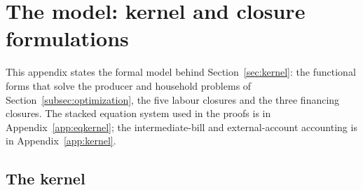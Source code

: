 \section{The model: kernel and closure formulations}\label{app:model}

\noindent This appendix states the formal model behind
Section~\ref{sec:kernel}: the functional forms that solve the producer and
household problems of Section~\ref{subsec:optimization}, the five labour
closures and the three financing closures. The stacked equation system used
in the proofs is in Appendix~\ref{app:eqkernel}; the intermediate-bill and
external-account accounting is in Appendix~\ref{app:kernel}.

\begingroup
\renewcommand*{\theHequation}{model.\arabic{equation}}

\subsection{The kernel}\label{app:model-kernel}

